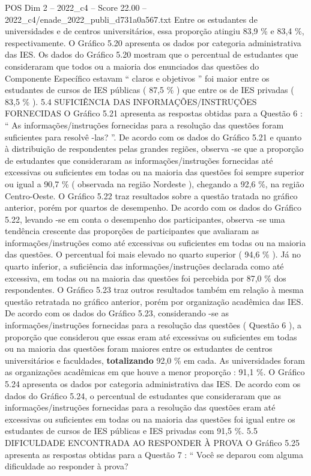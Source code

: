 \begin{textsample}{POS Dim 2 – 2022\_c4 – Score 22.00 – 2022\_c4/enade\_2022\_publi\_d731a0a567.txt}
Entre os estudantes de universidades e de centros universitários, essa proporção atingiu 83,9 \% e 83,4 \%, respectivamente.
O Gráfico 5.20 apresenta os dados por categoria administrativa das IES.
Os dados do Gráfico 5.20 mostram que o percentual de estudantes que consideraram que todos ou a maioria dos enunciados das questões do Componente Específico estavam “ claros e objetivos ” foi maior entre os estudantes de cursos de IES públicas ( 87,5 \% ) que entre os de IES privadas ( 83,5 \% ). 5.4 SUFICIÊNCIA DAS INFORMAÇÕES/INSTRUÇÕES FORNECIDAS O Gráfico 5.21 apresenta as respostas obtidas para a Questão 6 : “ As informações/instruções fornecidas para a resolução das questões foram suficientes para resolvê -las? ”.
De acordo com os dados do Gráfico 5.21 e quanto à distribuição de respondentes pelas grandes regiões, observa -se que a proporção de estudantes que consideraram as informações/instruções fornecidas até excessivas ou suficientes em todas ou na maioria das questões foi sempre superior ou igual a 90,7 \% ( observada na região Nordeste ), chegando a 92,6 \%, na região Centro-Oeste.
O Gráfico 5.22 traz resultados sobre a questão tratada no gráfico anterior, porém por quartos de desempenho.
De acordo com os dados do Gráfico 5.22, levando -se em conta o desempenho dos participantes, observa -se uma tendência crescente das proporções de participantes que avaliaram as informações/instruções como até excessivas ou suficientes em todas ou na maioria das questões.
O percentual foi mais elevado no quarto superior ( 94,6 \% ).
Já no quarto inferior, a suficiência das informações/instruções declarada como até excessiva, em todas ou na maioria das questões foi percebida por 87,0 \% dos respondentes.
O Gráfico 5.23 traz outros resultados também em relação à mesma questão retratada no gráfico anterior, porém por organização acadêmica das IES.
De acordo com os dados do Gráfico 5.23, considerando -se as informações/instruções fornecidas para a resolução das questões ( Questão 6 ), a proporção que considerou que essas eram até excessivas ou suficientes em todas ou na maioria das questões foram maiores entre os estudantes de centros universitários e faculdades, \textbf{totalizando} 92,0 \% em cada.
As universidades foram as organizações acadêmicas em que houve a menor proporção : 91,1 \%.
O Gráfico 5.24 apresenta os dados por categoria administrativa das IES.
De acordo com os dados do Gráfico 5.24, o percentual de estudantes que consideraram que as informações/instruções fornecidas para a resolução das questões eram até excessivas ou suficientes em todas ou na maioria das questões foi igual entre os estudantes de cursos de IES públicas e IES privadas com 91,5 \%. 5.5 DIFICULDADE ENCONTRADA AO RESPONDER À PROVA O Gráfico 5.25 apresenta as respostas obtidas para a Questão 7 : “ Você se deparou com alguma dificuldade ao responder à prova?

\end{textsample}
